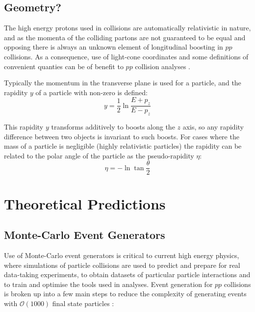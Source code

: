 	\subsection{Geometry?}
	
	The high energy protons used in collisions are automatically relativistic in nature, and as the momenta of the colliding partons are not guaranteed to be equal and opposing there is always an unknown element of longitudinal boosting in $pp$ collisions. As a consequence, use of light-cone coordinates and some definitions of convenient quanties can be of benefit to $pp$ collision analyses \cite{lightcone-all-that}.
	
	Typically the momentum in the transverse plane \pt is used for a particle, and the rapidity $y$ of a particle with non-zero \pt is defined:
	\begin{equation}
	y = \frac{1}{2}\ln\frac{E+p_z}{E- p_z}
	\end{equation}  
	
	This rapidity $y$ transforms additively to boosts along the $z$ axis, so any rapidity difference between two objects is invariant to such boosts. For cases where the mass of a particle is negligible (highly relativistic particles) the rapidity can be related to the polar angle of the particle as the pseudo-rapidity $\eta$:
	\begin{equation}
	\eta = -\ln\tan\frac{\theta}{2}
	\end{equation}

\section{Theoretical Predictions}


	\subsection{Monte-Carlo Event Generators}
	
		Use of Monte-Carlo event generators is critical to current high energy physics, where simulations of particle collisions are used to predict and prepare for real data-taking experiments, to obtain datasets of particular particle interactions and to train and optimise the tools used in analyses. Event generation for $pp$ collisions is broken up into a few main steps to reduce the complexity of generating events with $\mathcal{O}(1000)$ final state particles \cite{monte-carlo}:
		

